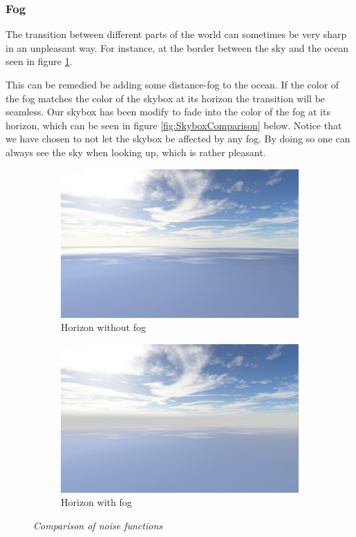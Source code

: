 \subsubsection{Fog}
The transition between different parts of the world can sometimes be very sharp in an unpleasant way. For instance, at the border between the sky and the ocean seen in figure \ref{fig:HorizonNoFog}. 

This can be remedied be adding some distance-fog to the ocean. If the color of the fog matches the color of the skybox at its horizon the transition will be seamless. Our skybox has been modify to fade into the color of the fog at its horizon, which can be seen in figure \ref{fig:SkyboxComparison} below. Notice that we have chosen to not let the skybox be affected by any fog. By doing so one can always see the sky when looking up, which is rather pleasant. 

\begin{figure}[H]
\begin{subfigure}{.5\textwidth}
  \centering
  \includegraphics[width=0.9\linewidth]{images/horizonNoFog.png}
  \caption{Horizon without fog}
  \label{fig:HorizonNoFog}
\end{subfigure}%
\begin{subfigure}{.5\textwidth}
  \centering
  \includegraphics[width=0.9\linewidth]{images/horizonFog.png}
  \caption{Horizon with fog}
  \label{fig:HorizonFog}
\end{subfigure}
\caption[Noise comparison]{\textit{Comparison of noise functions}}
\label{fig:HorizonFogComparison}
\end{figure}

